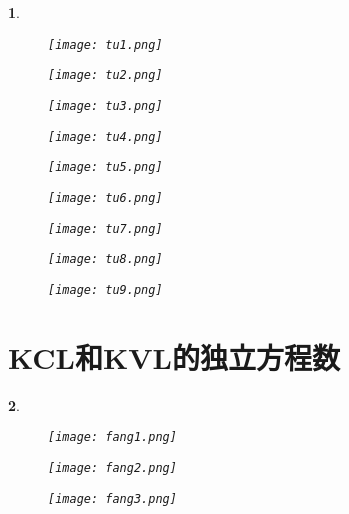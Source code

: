 \documentclass[UTF8]{report}
\theoremstyle{MyLineTheoremStyle} %
\theoremstyle{MyBlockTheoremStyle} %
\theoremstyle{MySubsubsectionStyle} %
\newtheorem{definition}{}
\begin{document}
\begin{definition}
    \begin{figure}[H]
        \centering
        \texttt{[image: tu1.png]}
    \end{figure}

    \begin{figure}[H]
        \centering
        \texttt{[image: tu2.png]}
    \end{figure}

    \begin{figure}[H]
        \centering
        \texttt{[image: tu3.png]}
    \end{figure}

    \begin{figure}[H]
        \centering
        \texttt{[image: tu4.png]}
    \end{figure}

    \begin{figure}[H]
        \centering
        \texttt{[image: tu5.png]}
    \end{figure}

    \begin{figure}[H]
        \centering
        \texttt{[image: tu6.png]}
    \end{figure}

    \begin{figure}[H]
        \centering
        \texttt{[image: tu7.png]}
    \end{figure}

    \begin{figure}[H]
        \centering
        \texttt{[image: tu8.png]}
    \end{figure}

    \begin{figure}[H]
        \centering
        \texttt{[image: tu9.png]}
    \end{figure}
\end{definition}

\section{KCL和KVL的独立方程数}

\begin{definition}
    \begin{figure}[H]
        \centering
        \texttt{[image: fang1.png]}
    \end{figure}

    \begin{figure}[H]
        \centering
        \texttt{[image: fang2.png]}
    \end{figure}

    \begin{figure}[H]
        \centering
        \texttt{[image: fang3.png]}
    \end{figure}
\end{definition}
\end{document}

